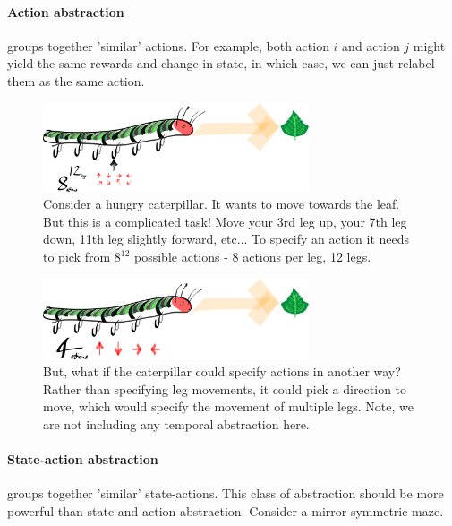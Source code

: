 \newpage
\paragraph{Action abstraction} groups together 'similar' actions. For
example, both action $i$ and action $j$ might yield the same rewards and change in state,
in which case, we can just relabel them as the same action.

\begin{figure}[h!]
\centering
\includegraphics[width=0.7\textwidth,height=0.15\textheight]{../../pictures/drawings/hungry-caterpillar.png}
\caption{Consider a hungry caterpillar. It wants to move towards the leaf.
But this is a complicated task! Move your 3rd leg up, your 7th leg down, 11th leg slightly forward, etc...
To specify an action it needs to pick from $8^{12}$ possible actions - 8 actions per leg, 12 legs.}
\end{figure}


\begin{figure}[h!]
\centering
\includegraphics[width=0.7\textwidth,height=0.15\textheight]{../../pictures/drawings/full-caterpillar.png}
\caption{But, what if the caterpillar could specify actions in another way? Rather than specifying leg movements, it could pick a direction to move, which would specify the movement of multiple legs. Note, we are not including any temporal abstraction here.}
\end{figure}

\paragraph{State-action abstraction} groups together 'similar' state-actions.
This class of abstraction should be more powerful than state and action abstraction. Consider a mirror symmetric maze.

